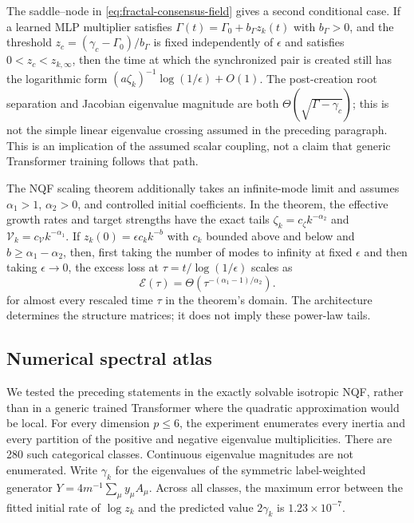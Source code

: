 \documentclass[11pt,a4paper]{article}
\theoremstyle{definition}
\begin{document}
The saddle--node in \eqref{eq:fractal-consensus-field} gives a second conditional
case.  If a learned MLP multiplier satisfies
$\Gamma(t)=\Gamma_0+b_\Gamma z_k(t)$ with $b_\Gamma>0$, and the threshold
$z_c=(\gamma_c-\Gamma_0)/b_\Gamma$ is fixed independently of $\epsilon$ and satisfies
$0<z_c<z_{k,\infty}$, then the time at which the
synchronized pair is created still has the logarithmic form
$(a\zeta_k)^{-1}\log(1/\epsilon)+O(1)$.  The post-creation root separation and
Jacobian eigenvalue magnitude are both
$\Theta(\sqrt{\Gamma-\gamma_c})$; this is not the simple linear eigenvalue crossing
assumed in the preceding paragraph.  This is
an implication of the assumed scalar coupling, not a claim that generic Transformer
training follows that path.

The NQF scaling theorem additionally takes an infinite-mode limit and assumes
$\alpha_1>1$, $\alpha_2>0$, and controlled initial coefficients.  In the theorem,
the effective growth rates and target strengths have the exact tails
$\zeta_k=c_\zeta k^{-\alpha_2}$ and
$\mathcal V_k=c_{\mathcal V}k^{-\alpha_1}$.  If
$z_k(0)=\epsilon c_k k^{-b}$ with $c_k$ bounded above and below and
$b\geq\alpha_1-\alpha_2$, then, first taking the number of modes to infinity at
fixed $\epsilon$ and then taking $\epsilon\to0$, the excess loss at
$\tau=t/\log(1/\epsilon)$ scales as
\begin{equation}
 \mathcal E(\tau)=\Theta\!\left(
 \tau^{-(\alpha_1-1)/\alpha_2}\right).
 \label{eq:nqf-scaling}
\end{equation}
for almost every rescaled time $\tau$ in the theorem's domain.
The architecture determines the structure matrices; it does not imply these
power-law tails.

\subsection{Numerical spectral atlas}

We tested the preceding statements in the exactly solvable isotropic NQF, rather than
in a generic trained Transformer where the quadratic approximation would be local.
For every dimension $p\leq6$, the experiment enumerates every inertia and every
partition of the positive and negative eigenvalue multiplicities.  There are 280 such
categorical classes.  Continuous eigenvalue magnitudes are not enumerated.  Write
$\gamma_k$ for the eigenvalues of the symmetric label-weighted generator
$Y=4m^{-1}\sum_\mu y_\mu A_\mu$.  Across all classes, the maximum error between the
fitted initial rate of $\log z_k$ and the predicted value $2\gamma_k$ is
$1.23\times10^{-7}$.
\end{document}
